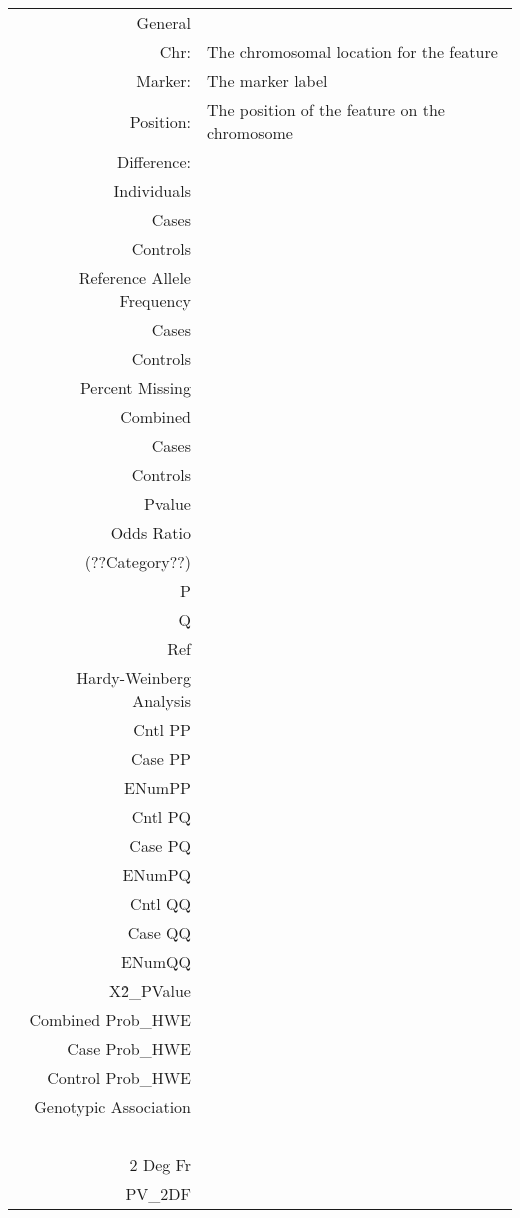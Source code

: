 \vspace{1em}
\begin{supertabular}{r p{5in}}
  General & ~ \\
    Chr: & The chromosomal location for the feature \\
    Marker: & The marker label \\
    Position: & The position of the feature on the chromosome \\
    Difference: & \\[1em]
  Individuals & ~ \\
    Cases  &  \\
    Controls  &  \\[1em]
  Reference Allele Frequency & ~ \\
    Cases  &  \\
    Controls  &  \\[1em]
  Percent Missing & ~ \\
    Combined  &  \\
    Cases  &  \\
    Controls  &  \\
    Pvalue  &  \\
    Odds Ratio  &  \\[1em]
  (??Category??) & ~ \\
    P  &  \\
    Q  &  \\
    Ref  &  \\[1em]
  Hardy-Weinberg Analysis & ~ \\[1em]
    Cntl PP  &  \\
    Case PP  &  \\
    ENumPP  &  \\
    Cntl PQ  &  \\
    Case PQ  &  \\
    ENumPQ  &  \\
    Cntl QQ  &  \\
    Case QQ  &  \\
    ENumQQ  &  \\
    X\^2\_PValue  &  \\
    Combined Prob\_HWE  &  \\
    Case Prob\_HWE  &  \\
    Control Prob\_HWE  &  \\[1em]
  Genotypic Association & ~ \\
  ~ & ~ \\
  2 Deg Fr & ~ \\
    PV\_2DF  &  \\

\end{supertabular}
